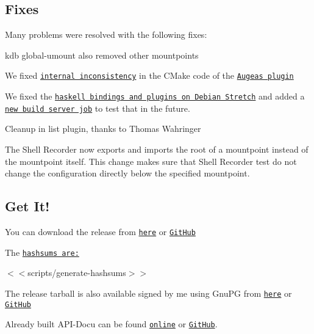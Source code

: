 \subsection*{Fixes}

Many problems were resolved with the following fixes\+:


\begin{DoxyItemize}
\item {\ttfamily kdb global-\/umount} also removed other mountpoints
\item We fixed \href{https://github.com/ElektraInitiative/libelektra/pull/1761}{\tt internal inconsistency} in the C\+Make code of the \href{https://www.libelektra.org/plugins/augeas}{\tt Augeas plugin}
\item We fixed the \href{https://github.com/ElektraInitiative/libelektra/pull/1787}{\tt haskell bindings and plugins on Debian Stretch} and added a \href{https://build.libelektra.org/job/elektra-haskell/}{\tt new build server job} to test that in the future.
\item Cleanup in list plugin, thanks to Thomas Wahringer
\item The Shell Recorder now exports and imports the root of a mountpoint instead of the mountpoint itself. This change makes sure that Shell Recorder test do not change the configuration directly below the specified mountpoint.
\end{DoxyItemize}

\subsection*{Get It!}

You can download the release from \href{https://www.libelektra.org/ftp/elektra/releases/elektra-0.8.22.tar.gz}{\tt here} or \href{https://github.com/ElektraInitiative/ftp/blob/master/releases/elektra-0.8.22.tar.gz?raw=true}{\tt Git\+Hub}

The \href{https://github.com/ElektraInitiative/ftp/blob/master/releases/elektra-0.8.22.tar.gz.hashsum?raw=true}{\tt hashsums are\+:}

$<$$<${\ttfamily scripts/generate-\/hashsums}$>$$>$

The release tarball is also available signed by me using Gnu\+PG from \href{https://www.libelektra.org/ftp/elektra/releases/elektra-0.8.22.tar.gz.gpg}{\tt here} or \href{https://github.com/ElektraInitiative/ftp/blob/master/releases//elektra-0.8.22.tar.gz.gpg?raw=true}{\tt Git\+Hub}

Already built A\+P\+I-\/\+Docu can be found \href{https://doc.libelektra.org/api/0.8.22/html/}{\tt online} or \href{https://github.com/ElektraInitiative/doc/tree/master/api/0.8.22}{\tt Git\+Hub}.

